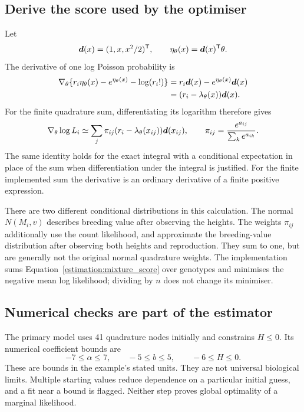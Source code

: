 \subsection{Derive the score used by the optimiser}
\label{estimation:score}

Let
\[
 \boldsymbol{d}(x)=(1,x,x^2/2)^{\mathsf T},
 \qquad
 \eta_\theta(x)=\boldsymbol{d}(x)^{\mathsf T}\theta.
\]
The derivative of one log Poisson probability is
\begin{align*}
 \nabla_\theta\{r_i\eta_\theta(x)-e^{\eta_\theta(x)}
                                -\log(r_i!)\}
 &=r_i\boldsymbol{d}(x)-e^{\eta_\theta(x)}\boldsymbol{d}(x)\\
 &=(r_i-\lambda_\theta(x))\boldsymbol{d}(x).
\end{align*}
For the finite quadrature sum, differentiating its logarithm therefore gives
\begin{equation}
 \nabla_\theta\log L_i
 \simeq\sum_j\pi_{ij}
        (r_i-\lambda_\theta(x_{ij}))\boldsymbol{d}(x_{ij}),
 \qquad
 \pi_{ij}=\frac{e^{a_{ij}}}{\sum_k e^{a_{ik}}}.
 \label{estimation:mixture_score}
\end{equation}
The same identity holds for the exact integral with a conditional expectation
in place of the sum when differentiation under the integral is justified.
For the finite implemented sum the derivative is an ordinary derivative of a
finite positive expression.

There are two different conditional distributions in this calculation.
The normal \(N(M_i,v)\) describes breeding value after observing the heights.
The weights \(\pi_{ij}\) additionally use the count likelihood, and approximate
the breeding-value distribution after observing both heights and reproduction.
They sum to one, but are generally not the original normal quadrature weights.
The implementation sums Equation~\eqref{estimation:mixture_score} over
genotypes and minimises the negative mean log likelihood; dividing by \(n\)
does not change its minimiser.

\subsection{Numerical checks are part of the estimator}

The primary model uses 41 quadrature nodes initially and constrains
\(H\leq0\). Its numerical coefficient bounds are
\[
 -7\leq\alpha\leq7,\qquad -5\leq b\leq5,\qquad -6\leq H\leq0.
\]
These are bounds in the example's stated units. They are not universal
biological limits. Multiple starting values reduce dependence on a particular
initial guess, and a fit near a bound is flagged. Neither step proves global
optimality of a marginal likelihood.


